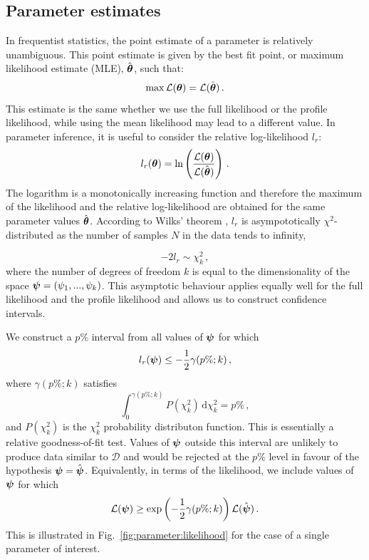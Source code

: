 \subsection{Parameter estimates}
\label{sec:ParamRecon:freqparams}
In frequentist statistics, the point estimate of a parameter is relatively unambiguous. This point estimate is given by the best fit point, or maximum likelihood estimate (MLE), $\hat{\boldsymbol\theta}$, such that:
\begin{equation}
\max \mathcal{L}(\boldsymbol\theta) = \mathcal{L}(\hat{\boldsymbol\theta})\,.
\end{equation}
This estimate is the same whether we use the full likelihood or the profile likelihood, while using the mean likelihood may lead to a different value. In parameter inference, it is useful to consider the relative log-likelihood $l_r$:
\begin{equation}
l_r(\boldsymbol\theta) = \ln\left(\frac{\mathcal{L}(\boldsymbol\theta)}{\mathcal{L}(\hat{\boldsymbol\theta})}\right)\,.
\end{equation}
The logarithm is a monotonically increasing function and therefore the maximum of the likelihood and the relative log-likelihood are obtained for the same parameter values $\hat{\boldsymbol\theta}$. According to Wilks' theorem \cite{Wilks:1938}, $l_r$ is asympototically $\chi^2$-distributed as the number of samples $N$ in the data tends to infinity,

\begin{equation}
-2l_r \sim \chi^2_k\,,
\end{equation}
where the number of degrees of freedom $k$ is equal to the dimensionality of the space $\boldsymbol\psi = \left(\psi_1,...,\psi_k\right)$. This asymptotic behaviour applies equally well for the full likelihood and the profile likelihood \cite{Biller:2014} and allows us to construct confidence intervals.

We construct a $p\%$ interval from all values of $\boldsymbol\psi$ for which
\begin{equation}
l_r(\boldsymbol\psi) \leq -\frac{1}{2} \gamma(p\%;k)\,,
\end{equation}
where $\gamma(p\%;k)$ satisfies
\begin{equation}
\int_{0}^{\gamma(p\%;k)} P(\chi^2_k)\,\mathrm{d}\chi^2_k = p\%\,,
\end{equation}
and $P(\chi^2_k)$ is the $\chi^2_k$ probability distributon function. This is essentially a relative goodness-of-fit test. Values of $\boldsymbol\psi$ outside this interval are unlikely to produce data similar to $\mathcal{D}$ and would be rejected at the $p\%$ level in favour of the hypothesis $\boldsymbol\psi = \hat{\boldsymbol\psi}$. Equivalently, in terms of the likelihood, we include values of $\boldsymbol\psi$ for which
\begin{equation}
\mathcal{L}(\boldsymbol\psi) \geq \exp\left(-\frac{1}{2} \gamma(p\%;k)\right) \mathcal{L}(\hat{\boldsymbol\psi})\,.
\end{equation}
This is illustrated in Fig.~\ref{fig:parameter:likelihood} for the case of a single parameter of interest.

